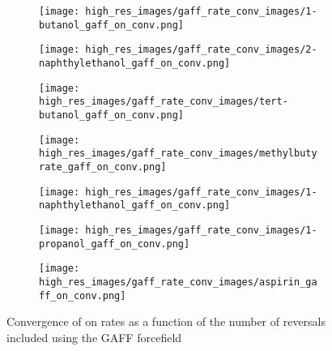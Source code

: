 \begin{figure}
\begin{subfigure}{0.3\linewidth}
	\centering
	\texttt{[image: high\_res\_images/gaff\_rate\_conv\_images/1-butanol\_gaff\_on\_conv.png]}
	\end{subfigure}%
\begin{subfigure}{0.3\linewidth}
		\texttt{[image: high\_res\_images/gaff\_rate\_conv\_images/2-naphthylethanol\_gaff\_on\_conv.png]}
\end{subfigure}%
	\begin{subfigure}{0.3\linewidth}
		\texttt{[image: high\_res\_images/gaff\_rate\_conv\_images/tert-butanol\_gaff\_on\_conv.png]}
	\end{subfigure}
	\begin{subfigure}{0.3\linewidth}
		\texttt{[image: high\_res\_images/gaff\_rate\_conv\_images/methylbutyrate\_gaff\_on\_conv.png]}
	\end{subfigure}
	\begin{subfigure}{0.3\linewidth}
		\texttt{[image: high\_res\_images/gaff\_rate\_conv\_images/1-naphthylethanol\_gaff\_on\_conv.png]}
	\end{subfigure}
	\begin{subfigure}{0.3\linewidth}
		\texttt{[image: high\_res\_images/gaff\_rate\_conv\_images/1-propanol\_gaff\_on\_conv.png]}
	\end{subfigure}
	\begin{subfigure}{0.3\linewidth}
		\texttt{[image: high\_res\_images/gaff\_rate\_conv\_images/aspirin\_gaff\_on\_conv.png]}
	\end{subfigure}
	\caption{Convergence of on rates as a function of the number of reversals included using the GAFF forcefield}
\end{figure}